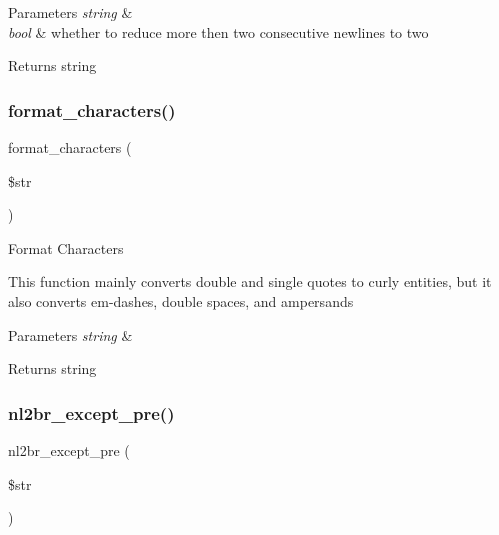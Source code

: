 \begin{DoxyParams}{Parameters}
{\em string} & \\
\hline
{\em bool} & whether to reduce more then two consecutive newlines to two \\
\hline
\end{DoxyParams}
\begin{DoxyReturn}{Returns}
string 
\end{DoxyReturn}
\mbox{\label{class_c_i___typography_a45df135c8811c2b27085dbdfd05a1eed}} 
\subsubsection{\texorpdfstring{format\+\_\+characters()}{format\_characters()}}
{\footnotesize\ttfamily format\+\_\+characters (\begin{DoxyParamCaption}\item[{}]{\$str }\end{DoxyParamCaption})}

Format Characters

This function mainly converts double and single quotes to curly entities, but it also converts em-\/dashes, double spaces, and ampersands


\begin{DoxyParams}{Parameters}
{\em string} & \\
\hline
\end{DoxyParams}
\begin{DoxyReturn}{Returns}
string 
\end{DoxyReturn}
\mbox{\label{class_c_i___typography_af9db9732eaa94a62b3a3ccc7f6bf860b}} 
\subsubsection{\texorpdfstring{nl2br\+\_\+except\+\_\+pre()}{nl2br\_except\_pre()}}
{\footnotesize\ttfamily nl2br\+\_\+except\+\_\+pre (\begin{DoxyParamCaption}\item[{}]{\$str }\end{DoxyParamCaption})}

